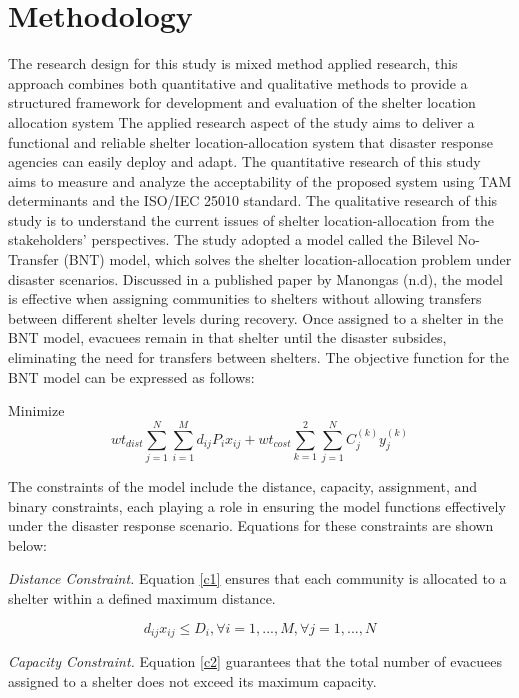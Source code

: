 \documentclass[12pt,a4paper,]{article}
\begin{document}
\section{Methodology}
	The research design for this study is mixed method applied research, this approach combines both quantitative and qualitative methods to provide a structured framework for development and evaluation of the shelter location allocation system
	The applied research aspect of the study aims to deliver a functional and reliable shelter location-allocation system that disaster response agencies can easily deploy and adapt. The quantitative research of this study aims to measure and analyze the acceptability of the proposed system using TAM determinants and the ISO/IEC 25010 standard. The qualitative research of this study is to understand the current issues of shelter location-allocation from the stakeholders’ perspectives.
	The study adopted a model called the Bilevel No-Transfer (BNT) model, which solves the shelter location-allocation problem under disaster scenarios. Discussed in a published paper by Manongas (n.d), the model is effective when assigning communities to shelters without allowing transfers between different shelter levels during recovery. Once assigned to a shelter in the BNT model, evacuees remain in that shelter until the disaster subsides, eliminating the need for transfers between shelters. The objective function for the BNT model can be expressed as follows:
	
	Minimize 
	\begin{equation}
	wt_{dist}\sum_{j=1}^{N}\sum_{i=1}^{M}d_{ij}P_{i}x_{ij}+wt_{cost}\sum_{k=1}^{2}\sum_{j=1}^{N}C_{j}^{(k)}y_{j}^{(k)} 
	\end{equation}
	
	The constraints of the model include the distance, capacity, assignment, and binary constraints, each playing a role in ensuring the model functions effectively under the disaster response scenario. Equations for these constraints are shown below:
	
		\textit{Distance Constraint.} Equation \ref{c1} ensures that each community is allocated to a shelter within a defined maximum distance. 
	
	\begin{equation} 	
		\label{c1}
		d_{ij}x_{ij} \le D_{i}, \forall i = 1,..., M,  \forall j = 1,..., N 
	\end{equation}
	
	\textit{Capacity Constraint.} Equation \ref{c2} guarantees that the total number of evacuees assigned to a shelter does not exceed its maximum capacity. 
	
\end{document}
